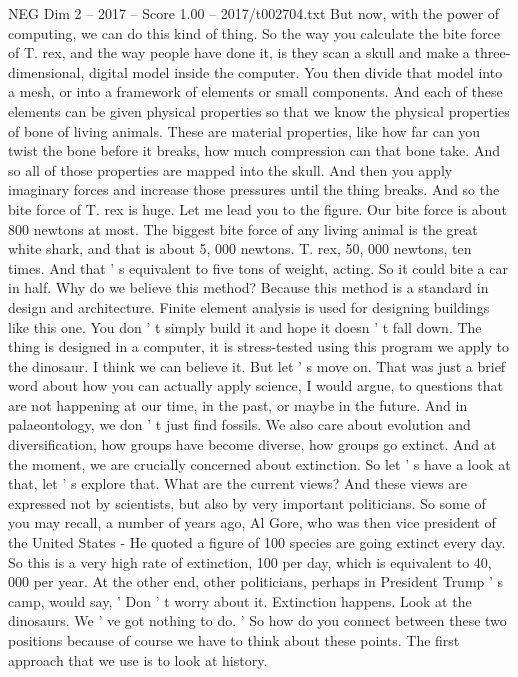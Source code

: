 \begin{textsample}{NEG Dim 2 – 2017 – Score 1.00 – 2017/t002704.txt}
But now, with the power of computing, we can do this kind of thing.
So the way you calculate the bite force of T. rex, and the way people have done it, is they scan a skull and make a three-dimensional, digital model inside the computer.
You then divide that model into a mesh, or into a framework of elements or small components.
And each of these elements can be given physical properties so that we know the physical properties of bone of living animals.
These are material properties, like how far can you twist the bone before it breaks, how much compression can that bone take.
And so all of those properties are mapped into the skull.
And then you apply imaginary forces and increase those pressures until the thing breaks.
And so the bite force of T. rex is huge.
Let me lead you to the figure.
Our bite force is about 800 newtons at most.
The biggest bite force of any living animal is the great white shark, and that is about 5, 000 newtons.
T. rex, 50, 000 newtons, ten times.
And that ' s equivalent to five tons of weight, acting.
So it could bite a car in half.
Why do we believe this method?
Because this method is a standard in design and architecture.
Finite element analysis is used for designing buildings like this one.
You don ' t simply build it and hope it doesn ' t fall down.
The thing is designed in a computer, it is stress-tested using this program we apply to the dinosaur.
I think we can believe it.
But let ' s move on.
That was just a brief word about how you can actually apply science, I would argue, to questions that are not happening at our time, in the past, or maybe in the future.
And in palaeontology, we don ' t just find fossils.
We also care about evolution and diversification, how groups have become diverse, how groups go extinct.
And at the moment, we are crucially concerned about extinction.
So let ' s have a look at that, let ' s explore that.
What are the current views?
And these views are expressed not by scientists, but also by very important politicians.
So some of you may recall, a number of years ago, Al Gore, who was then vice president of the United States - He quoted a figure of 100 species are going extinct every day.
So this is a very high rate of extinction, 100 per day, which is equivalent to 40, 000 per year.
At the other end, other politicians, perhaps in President Trump ' s camp, would say, ' Don ' t worry about it.
Extinction happens.
Look at the dinosaurs.
We ' ve got nothing to do. ' So how do you connect between these two positions because of course we have to think about these points.
The first approach that we use is to look at history.

\end{textsample}
